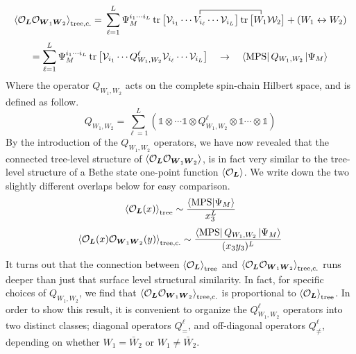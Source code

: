 \newpage
%
%
\begin{equation*}
\expval{\mathcal{O}_{\boldsymbol{L}} \mathcal{O}_{\boldsymbol{W}_1 \boldsymbol{W}_2}}_{\text{tree,c.}}
=
\contraction{\sum_{\ell=1}^L \Psi^{i_1 \cdots i_L} 
\tr \big[ \mathcal{V}_{i_1} \cdots }
{V_{i_\ell}}
{ \cdots \mathcal{V}_{i_L} \big] \tr \big[ }
{W_1}
\sum_{\ell=1}^L \Psi_M^{i_1 \cdots i_L} 
\tr \big[ \mathcal{V}_{i_1} \cdots V_{i_\ell} \cdots \mathcal{V}_{i_L} \big] 
\tr \big[ W_1 \mathcal{W}_2 \big]
+
(W_1 \leftrightarrow W_2)
\end{equation*}
%
%
\begin{equation}\label{MPS Q Bethe state overlap}
= \sum_{\ell=1}^L \Psi_M^{i_1 \cdots i_L} 
\tr \big[ \mathcal{V}_{i_1} \cdots Q^\ell_{W_1,W_2} \mathcal{V}_{i_\ell} \cdots \mathcal{V}_{i_L} \big]
%
\quad \rightarrow \quad
%
\bra{\text{MPS}} Q_{W_1,W_2} \ket{\Psi_M}
\end{equation}
%
%
Where the operator $Q_{W_1,W_2}$ acts on the complete spin-chain Hilbert space, and is defined as follow. 
%
%
\begin{equation}
Q_{W_1,W_2}
=
\sum_{\ell = 1}^L
\left(
\mathbb{1} \otimes \cdots \mathbb{1}
\otimes Q^{\ell}_{W_1,W_2} \otimes
\mathbb{1} \cdots \otimes \mathbb{1}
\right)
\end{equation}
%
%
By the introduction of the $Q_{W_1,W_2}$ operators, we have now revealed that the connected tree-level structure of $\expval{\mathcal{O}_{\boldsymbol{L}} \mathcal{O}_{\boldsymbol{W}_1 \boldsymbol{W}_2}}$, is in fact very similar to the tree-level structure of a Bethe state one-point function $\expval{\mathcal{O}_{\boldsymbol{L}}}$. We write down the two slightly different overlaps below for easy comparison.
%
%
\begin{equation}
\expval{\mathcal{O}_{\boldsymbol{L}}(x)}_{\text{tree}}
\sim
\frac{\bra{\text{MPS}} \ket{\Psi_M}}{x_3^L} 
\end{equation}
%
%
\begin{equation}
\expval{\mathcal{O}_{\boldsymbol{L}}(x) \mathcal{O}_{\boldsymbol{W}_1 \boldsymbol{W}_2}(y)}_{\text{tree,c.}}
\sim
\frac{\bra{\text{MPS}} Q_{W_1,W_2} \ket{\Psi_M}}{(x_3 y_3)^L}
\end{equation}
%
%
It turns out that the connection between $\expval{\mathcal{O}_{\boldsymbol{L}}}_{\text{tree}}$ and $\expval{\mathcal{O}_{\boldsymbol{L}} \mathcal{O}_{\boldsymbol{W}_1 \boldsymbol{W}_2}}_{\text{tree,c.}}$ runs deeper than just that surface level structural similarity. In fact, for specific choices of $Q_{W_1,W_2}$, we find that $\expval{\mathcal{O}_{\boldsymbol{L}} \mathcal{O}_{\boldsymbol{W}_1 \boldsymbol{W}_2}}_{\text{tree,c.}}$ is proportional to $\expval{\mathcal{O}_{\boldsymbol{L}}}_{\text{tree}}$. In order to show this result, it is convenient to organize the $Q^\ell_{W_1,W_2}$ operators into two distinct classes; diagonal operators $Q_{=}^\ell$, and off-diagonal operators $Q^{\ell}_{\neq}$, depending on whether $W_1 = \bar{W}_2$ or $W_1 \neq \bar{W}_2$.
